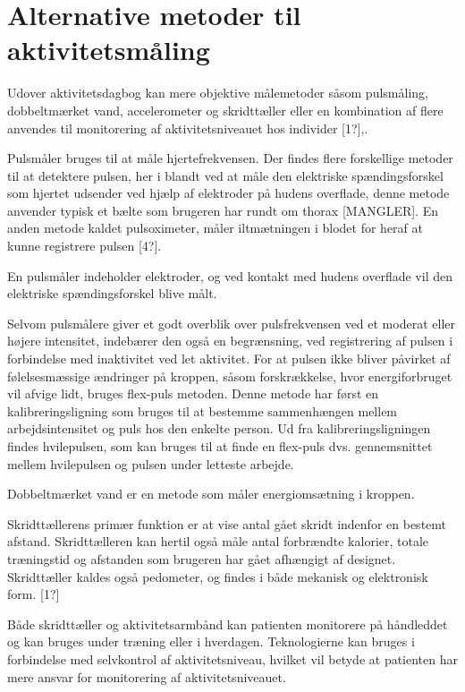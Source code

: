 \section{Alternative metoder til aktivitetsmåling}
Udover aktivitetsdagbog kan mere objektive målemetoder såsom pulsmåling, dobbeltmærket vand, accelerometer og skridttæller eller en kombination af flere anvendes til monitorering af aktivitetsniveauet hos individer [1?],\cite{motionsraad2007}. 

Pulsmåler bruges til at måle hjertefrekvensen. Der findes flere forskellige metoder til at detektere pulsen, her i blandt ved at måle den elektriske spændingsforskel som hjertet udsender ved hjælp af elektroder på hudens overflade, denne metode anvender typisk et bælte som brugeren har rundt om thorax \cite{motionsraad2007} [MANGLER]. En anden metode kaldet pulsoximeter, måler iltmætningen i blodet for heraf at kunne registrere pulsen [4?]. 

En pulsmåler indeholder elektroder, og ved kontakt med hudens overflade vil den elektriske spændingsforskel blive målt. 

Selvom pulsmålere giver et godt overblik over pulsfrekvensen ved et moderat eller højere intensitet, indebærer den også en begrænsning, ved registrering af pulsen i forbindelse med inaktivitet ved let aktivitet. For at pulsen ikke bliver påvirket af følelsesmæssige ændringer på kroppen, såsom forskrækkelse, hvor energiforbruget vil afvige lidt,  bruges flex-puls metoden. Denne metode har først en kalibreringsligning som bruges til at bestemme sammenhængen mellem arbejdsintensitet og puls hos den enkelte person. Ud fra kalibreringsligningen findes hvilepulsen, som kan bruges til at finde en flex-puls dvs. gennemsnittet mellem hvilepulsen og pulsen under letteste arbejde. \cite{motionsraad2007}

Dobbeltmærket vand er en metode som måler energiomsætning i kroppen. 

Skridttællerens primær funktion er at vise antal gået skridt indenfor en bestemt afstand. Skridttælleren kan hertil også måle antal forbrændte kalorier, totale træningstid og afstanden som brugeren har gået afhængigt af  designet. Skridttæller kaldes også pedometer, og findes i både mekanisk og elektronisk form. [1?]

Både skridttæller og aktivitetsarmbånd kan patienten monitorere på håndleddet og kan bruges under træning eller i hverdagen. Teknologierne kan bruges i forbindelse med selvkontrol af aktivitetsniveau, hvilket vil betyde at patienten har mere ansvar for monitorering af aktivitetsniveauet. 

